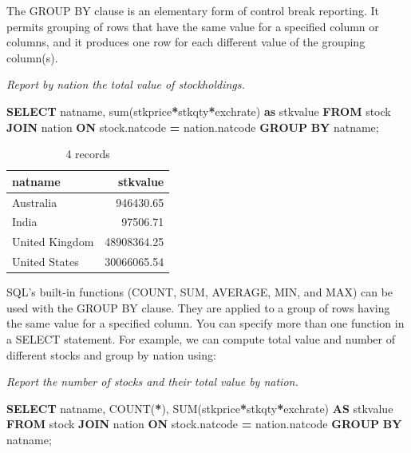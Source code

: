 \documentclass[
]{article}
\newenvironment{Shaded}{\begin{snugshade}}{\end{snugshade}}
\newcommand{\FunctionTok}[1]{\textcolor[rgb]{0.00,0.00,0.00}{#1}}
\newcommand{\KeywordTok}[1]{\textcolor[rgb]{0.13,0.29,0.53}{\textbf{#1}}}
\newcommand{\NormalTok}[1]{#1}
\newcommand{\OperatorTok}[1]{\textcolor[rgb]{0.81,0.36,0.00}{\textbf{#1}}}
\begin{document}
The GROUP BY clause is an elementary form of control break reporting. It
permits grouping of rows that have the same value for a specified column
or columns, and it produces one row for each different value of the
grouping column(s).

\emph{Report by nation the total value of stockholdings.}

\begin{Shaded}
\begin{Highlighting}[]
\KeywordTok{SELECT}\NormalTok{ natname, }\FunctionTok{sum}\NormalTok{(stkprice}\OperatorTok{*}\NormalTok{stkqty}\OperatorTok{*}\NormalTok{exchrate) }\KeywordTok{as}\NormalTok{ stkvalue}
    \KeywordTok{FROM}\NormalTok{ stock }\KeywordTok{JOIN}\NormalTok{ nation }\KeywordTok{ON}\NormalTok{ stock.natcode }\OperatorTok{=}\NormalTok{ nation.natcode}
        \KeywordTok{GROUP} \KeywordTok{BY}\NormalTok{ natname;}
\end{Highlighting}
\end{Shaded}

\begin{table}

\caption{\label{tab:unnamed-chunk-43}4 records}
\centering
\begin{tabular}[t]{l|r}
\hline
natname & stkvalue\\
\hline
Australia & 946430.65\\
\hline
India & 97506.71\\
\hline
United Kingdom & 48908364.25\\
\hline
United States & 30066065.54\\
\hline
\end{tabular}
\end{table}

SQL's built-in functions (COUNT, SUM, AVERAGE, MIN, and MAX) can be used
with the GROUP BY clause. They are applied to a group of rows having the
same value for a specified column. You can specify more than one
function in a SELECT statement. For example, we can compute total value
and number of different stocks and group by nation using:

\emph{Report the number of stocks and their total value by nation.}

\begin{Shaded}
\begin{Highlighting}[]
\KeywordTok{SELECT}\NormalTok{ natname, }\FunctionTok{COUNT}\NormalTok{(}\OperatorTok{*}\NormalTok{), }\FunctionTok{SUM}\NormalTok{(stkprice}\OperatorTok{*}\NormalTok{stkqty}\OperatorTok{*}\NormalTok{exchrate) }\KeywordTok{AS}\NormalTok{ stkvalue}
    \KeywordTok{FROM}\NormalTok{ stock }\KeywordTok{JOIN}\NormalTok{ nation }\KeywordTok{ON}\NormalTok{ stock.natcode }\OperatorTok{=}\NormalTok{ nation.natcode}
        \KeywordTok{GROUP} \KeywordTok{BY}\NormalTok{ natname;}
\end{Highlighting}
\end{Shaded}
\end{document}
